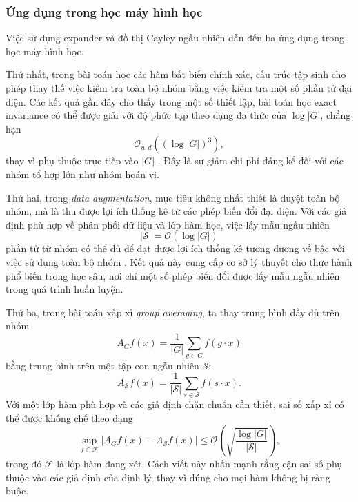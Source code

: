 \subsubsection{Ứng dụng trong học máy hình học}

Việc sử dụng expander và đồ thị Cayley ngẫu nhiên dẫn đến ba ứng dụng trong học máy hình học.

Thứ nhất, trong bài toán học các hàm bất biến chính xác, cấu trúc tập sinh cho phép thay thế việc kiểm tra toàn bộ nhóm bằng việc kiểm tra một số phần tử đại diện. Các kết quả gần đây cho thấy trong một số thiết lập, bài toán học exact invariance có thể được giải với độ phức tạp theo dạng đa thức của $\log |G|$, chẳng hạn
\begin{equation}
    \mathcal{O}_{n,d}\left((\log |G|)^3\right),
    \label{eq:exact-invariance-complexity}
\end{equation}
thay vì phụ thuộc trực tiếp vào $|G|$ \cite{soleymani2025icml}. Đây là sự giảm chi phí đáng kể đối với các nhóm tổ hợp lớn như nhóm hoán vị.

Thứ hai, trong \textit{data augmentation}, mục tiêu không nhất thiết là duyệt toàn bộ nhóm, mà là thu được lợi ích thống kê từ các phép biến đổi đại diện. Với các giả định phù hợp về phân phối dữ liệu và lớp hàm học, việc lấy mẫu ngẫu nhiên
\begin{equation}
    |\mathcal{S}| = \mathcal{O}(\log |G|)
    \label{eq:augmentation-log-samples}
\end{equation}
phần tử từ nhóm có thể đủ để đạt được lợi ích thống kê tương đương về bậc với việc sử dụng toàn bộ nhóm \cite{tahmasebi2025aug}. Kết quả này cung cấp cơ sở lý thuyết cho thực hành phổ biến trong học sâu, nơi chỉ một số phép biến đổi được lấy mẫu ngẫu nhiên trong quá trình huấn luyện.

Thứ ba, trong bài toán xấp xỉ \textit{group averaging}, ta thay trung bình đầy đủ trên nhóm
\begin{equation}
    A_G f(x)
    =
    \frac{1}{|G|}
    \sum_{g \in G} f(g \cdot x)
    \label{eq:full-group-average}
\end{equation}
bằng trung bình trên một tập con ngẫu nhiên $\mathcal{S}$:
\begin{equation}
    A_{\mathcal{S}} f(x)
    =
    \frac{1}{|\mathcal{S}|}
    \sum_{s \in \mathcal{S}} f(s \cdot x).
    \label{eq:sampled-group-average}
\end{equation}
Với một lớp hàm phù hợp và các giả định chặn chuẩn cần thiết, sai số xấp xỉ có thể được khống chế theo dạng
\begin{equation}
    \sup_{f \in \mathcal{F}}
    \left|
        A_G f(x) - A_{\mathcal{S}} f(x)
    \right|
    \leq
    \mathcal{O}
    \left(
        \sqrt{
            \frac{\log |G|}{|\mathcal{S}|}
        }
    \right),
    \label{eq:approximate-group-averaging-bound}
\end{equation}
trong đó $\mathcal{F}$ là lớp hàm đang xét. Cách viết này nhấn mạnh rằng cận sai số phụ thuộc vào các giả định của định lý, thay vì đúng cho mọi hàm không bị ràng buộc.

